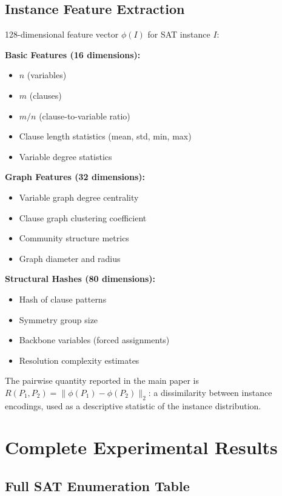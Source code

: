 \documentclass[11pt]{article}
\begin{document}
\subsection{Instance Feature Extraction}

128-dimensional feature vector $\phi(I)$ for SAT instance $I$:

\textbf{Basic Features (16 dimensions):}
\begin{itemize}
\item $n$ (variables)
\item $m$ (clauses)
\item $m/n$ (clause-to-variable ratio)
\item Clause length statistics (mean, std, min, max)
\item Variable degree statistics
\end{itemize}

\textbf{Graph Features (32 dimensions):}
\begin{itemize}
\item Variable graph degree centrality
\item Clause graph clustering coefficient
\item Community structure metrics
\item Graph diameter and radius
\end{itemize}

\textbf{Structural Hashes (80 dimensions):}
\begin{itemize}
\item Hash of clause patterns
\item Symmetry group size
\item Backbone variables (forced assignments)
\item Resolution complexity estimates
\end{itemize}

The pairwise quantity reported in the main paper is
$R(P_1,P_2) = \|\phi(P_1) - \phi(P_2)\|_2$: a dissimilarity between instance
encodings, used as a descriptive statistic of the instance distribution.

\section{Complete Experimental Results}

\subsection{Full SAT Enumeration Table}
\end{document}
